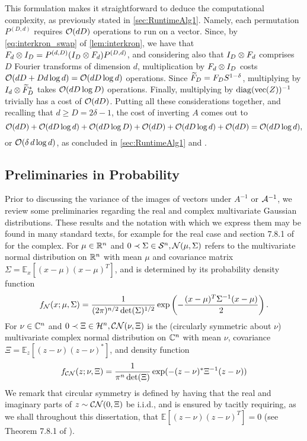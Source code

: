 This formulation makes it straightforward to deduce the computational complexity, as previously stated in \cref{sec:RuntimeAlg1}.  Namely, each permutation $P^{(D, d)}$ requires $\mathcal{O}(d D)$ operations to run on a vector.  Since, by \eqref{eq:interkron_swap} of \cref{lem:interkron}, we have that $F_d \otimes I_D = P^{(d, D)}(I_D \otimes F_d) P^{(D, d)}$, and considering also that $I_D \otimes F_d$ comprises $D$ Fourier transforms of dimension $d$, multiplication by $F_d \otimes I_D$ costs $\mathcal{O}(d D + D d \log d) = \mathcal{O}(d D \log d)$ operations.  Since $\widetilde{F}_D = F_D S^{1-\delta}$, multiplying by $I_d \otimes \widetilde{F}_D^*$ takes $\mathcal{O}(d D \log D)$ operations.  Finally, multiplying by $\operatorname{diag}(\operatorname{vec}(Z))^{-1}$ trivially has a cost of $\mathcal{O}(d D)$.  Putting all these considerations together, and recalling that $d \ge D = 2 \delta - 1$, the cost of inverting $A$ comes out to \[\mathcal{O}(d D) + \mathcal{O}(d D \log d) + \mathcal{O}(d D \log D) + \mathcal{O}(d D) + \mathcal{O}(d D \log d) + \mathcal{O}(d D) = \mathcal{O}(d D \log d),\] or $\mathcal{O}(\delta\, d \log d)$, as concluded in \cref{sec:RuntimeAlg1} and \cite{IVW2015_FastPhase}.

\subsection{Preliminaries in Probability}
Prior to discussing the variance of the images of vectors under $A^{-1}$ or $\mathcal{A}^{-1}$, we review some preliminaries regarding the real and complex multivariate Gaussian distributions.  These results and the notation with which we express them may be found in many standard texts, for example \cite{tong1990normal} for the real case and section 7.8.1 of \cite{gallager2008digital} for the complex.  For $\mu \in \mathbb{R}^n$ and $0 \prec \Sigma \in \mathcal{S}^n, \mathcal{N}(\mu, \Sigma)$ refers to the multivariate normal distribution on $\mathbb{R}^n$ with mean $\mu$ and covariance matrix $\Sigma = \mathbb{E}_x[(x - \mu) (x - \mu)^T]$, and is determined by its probability density function \[f_{\mathcal{N}}(x; \mu, \Sigma) = \frac{1}{(2 \pi)^{n / 2} \det(\Sigma)^{1 / 2}} \exp\left(- \dfrac{(x - \mu)^T \Sigma^{-1} (x - \mu)}{2}\right).\]  For $\nu \in \mathbb{C}^n$ and $0 \prec \Xi \in \mathcal{H}^n, \mathcal{C N}(\nu, \Xi)$ is the (circularly symmetric about $\nu$) multivariate complex normal distribution on $\mathbb{C}^n$ with mean $\nu$, covariance $\Xi = \mathbb{E}_z[(z - \nu) (z - \nu)^*]$, and density function \[f_{\mathcal{C N}}(z; \nu, \Xi) = \dfrac{1}{\pi^n \det(\Xi)} \exp(- (z - \nu)^* \Xi^{-1} (z - \nu))\]  We remark that circular symmetry is defined by having that the real and imaginary parts of $z \sim \mathcal{C N}(0, \Xi)$ be i.i.d., and is ensured by tacitly requiring, as we shall throughout this dissertation, that $\mathbb{E}[(z - \nu) (z - \nu)^T] = 0$ (see Theorem 7.8.1 of \cite{gallager2008digital}).

